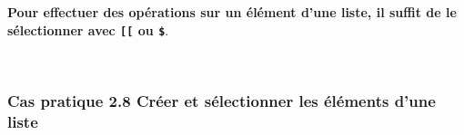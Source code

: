 \documentclass[12pt,twosided, notitlepage]{book}
\newenvironment{Shaded}{}{}
\newcommand{\CommentTok}[1]{\textcolor[rgb]{0.00,0.50,0.00}{#1}}
\newcommand{\DecValTok}[1]{#1}
\newcommand{\KeywordTok}[1]{\textcolor[rgb]{0.00,0.00,1.00}{#1}}
\newcommand{\NormalTok}[1]{#1}
\newcommand{\OperatorTok}[1]{#1}
\renewenvironment{Shaded}{\begin{snugshade}}{\end{snugshade}}
\begin{document}
\textbf{Pour effectuer des opérations sur un élément d'une liste, il
suffit de le sélectionner avec \texttt{{[}{[}} ou \texttt{\$}}.

\begin{Shaded}
\end{Shaded}

~

\hypertarget{cas-pratique-2.8-creer-et-selectionner-les-elements-dune-liste}{%
\subsubsection{\texorpdfstring{\textbf{Cas pratique 2.8} Créer et
sélectionner les éléments d'une
liste}{Cas pratique 2.8 Créer et sélectionner les éléments d'une liste}}\label{cas-pratique-2.8-creer-et-selectionner-les-elements-dune-liste}}

\end{document}
